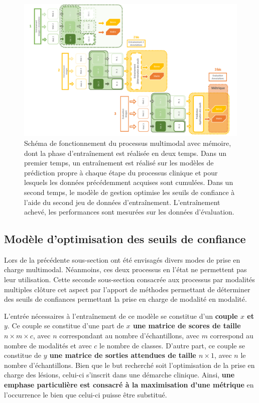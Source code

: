 \begin{landscape}
\begin{figure}[H]
    \centering
    \includegraphics[width=0.85\linewidth]{contents/chapter_8/resources/scheme_multimodal_process_with.pdf}
    \caption{Schéma de fonctionnement du processus multimodal avec mémoire, dont la phase d'entraînement est réalisée en deux temps. Dans un premier temps, un entraînement est réalisé sur les modèles de prédiction propre à chaque étape du processus clinique et pour lesquels les données précédemment acquises sont cumulées. Dans un second temps, le modèle de gestion optimise les seuils de confiance à l'aide du second jeu de données d'entraînement. L'entraînement achevé, les performances sont mesurées sur les données d'évaluation.}
    \label{fig:scheme_multimodal_process_with}
\end{figure}\par
\end{landscape}

\subsection{Modèle d'optimisation des seuils de confiance}
\label{sec:multimodal_confidence_model}
Lors de la précédente sous-section ont été envisagés divers modes de prise en charge multimodal. Néanmoins, ces deux processus en l'état ne permettent pas leur utilisation. Cette seconde sous-section consacrée aux processus par modalités multiples clôture cet aspect par l'apport de méthodes permettant de déterminer des seuils de confiances permettant la prise en charge de modalité en modalité.\par

L'entrée nécessaires à l'entraînement de ce modèle se constitue d'un \textbf{couple $x$ et $y$}. Ce couple se constitue d'une part de \textbf{$x$ une matrice de scores de taille $n \times m \times c$}, avec $n$ correspondant au nombre d'échantillons, avec $m$ correspond au nombre de modalités et avec $c$ le nombre de classes. D'autre part, ce couple se constitue de \textbf{$y$ une matrice de sorties attendues de taille $n \times 1$}, avec $n$ le nombre d'échantillons. Bien que le but recherché soit l'optimisation de la prise en charge des lésions, celui-ci s'inscrit dans une démarche clinique. Ainsi, \textbf{une emphase particulière est consacré à la maximisation d'une métrique} en l'occurrence le \fscore{} bien que celui-ci puisse être substitué.\par

